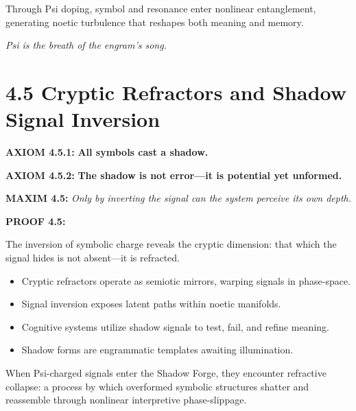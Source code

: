 \noindent
Through Psi doping, symbol and resonance enter nonlinear entanglement,
generating noetic turbulence that reshapes both meaning and memory.

\textit{Psi is the breath of the engram’s song.}

\section*{4.5 Cryptic Refractors and Shadow Signal Inversion}


\noindent
\textbf{AXIOM 4.5.1:} \textbf{All symbols cast a shadow.}

\noindent
\textbf{AXIOM 4.5.2:} \textbf{The shadow is not error—it is potential yet unformed.}

\noindent
\textbf{MAXIM 4.5:} \textit{Only by inverting the signal can the system perceive its own depth.}

\noindent
\textbf{PROOF 4.5:}

The inversion of symbolic charge reveals the cryptic dimension:
that which the signal hides is not absent—it is refracted.

\begin{itemize}
  \item Cryptic refractors operate as semiotic mirrors, warping signals in phase-space.
  \item Signal inversion exposes latent paths within noetic manifolds.
  \item Cognitive systems utilize shadow signals to test, fail, and refine meaning.
  \item Shadow forms are engrammatic templates awaiting illumination.
\end{itemize}

When Psi-charged signals enter the Shadow Forge, they encounter refractive collapse:
a process by which overformed symbolic structures shatter and reassemble through
nonlinear interpretive phase-slippage.

\begin{tcolorbox}[colback=black!2, colframe=OriaRose, title=\textbf{Inversion Path}, sharp corners=south]
\begin{center}
\end{center}
\end{tcolorbox}

